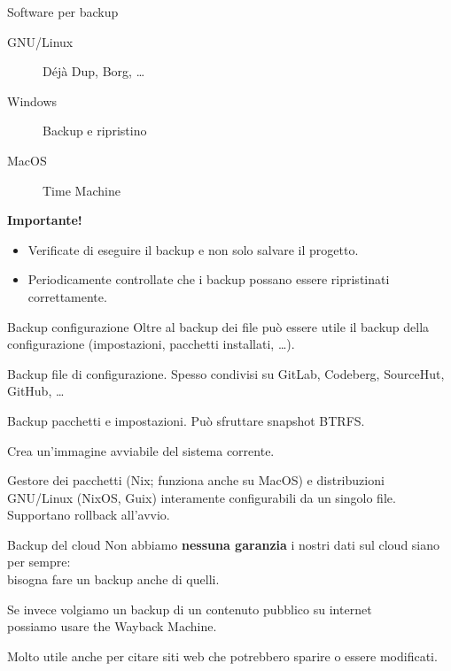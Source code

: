 \begin{myframe}{Software per backup}
  \begin{description}
    \item[GNU/Linux] Déjà Dup, Borg, \dots
    \item[Windows] Backup e ripristino
    \item[MacOS] Time Machine
  \end{description}
  \pause\bigskip

  \textbf{Importante!}
  \begin{itemize}[<+->]
    \item Verificate di eseguire il backup e non solo salvare il progetto.
    \item Periodicamente controllate che i backup possano essere ripristinati correttamente.
  \end{itemize}
\end{myframe}

\begin{myframe}{Backup configurazione}
  Oltre al backup dei file può essere utile il backup della configurazione (impostazioni, pacchetti installati, \dots).
  \pause
  \begin{description}[<+->]
    \item[dotfiles] Backup file di configurazione. Spesso condivisi su GitLab, Codeberg, SourceHut, GitHub, \dots
    \item[Timeshift] Backup pacchetti e impostazioni. Può sfruttare snapshot BTRFS.
    \item[MxLinux snapshot] Crea un'immagine avviabile del sistema corrente.
    \item[Nix, NixOs, Guix] Gestore dei pacchetti (Nix; funziona anche su MacOS) e distribuzioni GNU/Linux (NixOS, Guix) interamente configurabili da un singolo file. Supportano rollback all'avvio.
  \end{description}
\end{myframe}

\begin{myframe}{Backup del cloud}
  Non abbiamo \textbf{nessuna garanzia} i nostri dati sul cloud siano per sempre:\\bisogna fare un backup anche di quelli.

  \pause\bigskip\bigskip

  Se invece volgiamo un backup di un contenuto pubblico su internet\\possiamo usare the Wayback Machine.

  Molto utile anche per citare siti web che potrebbero sparire o essere modificati.
\end{myframe}

